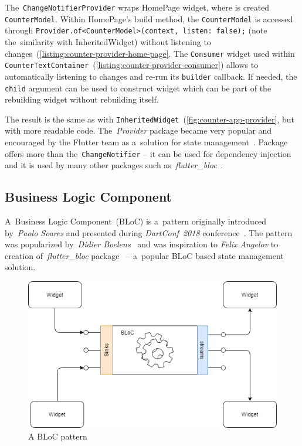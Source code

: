 The~\verb|ChangeNotifierProvider| wraps HomePage widget, where is created \verb|CounterModel|. Within HomePage's build method, the \verb|CounterModel| is accessed through \verb|Provider.of<CounterModel>(context, listen: false);| (note the~similarity with InheritedWidget) without listening to changes~(\cref{listing:counter-provider-home-page}. The \verb|Consumer| widget used within \verb|CounterTextContainer|~(\cref{listing:counter-provider-consumer}) allows to automatically listening to changes and re-run its \verb|builder| callback. If needed, the \verb|child| argument can be used to construct widget which can be part of the rebuilding widget without rebuilding itself. 

The result is the same as with \verb|InheritedWidget|~(\cref{fig:counter-app-provider}, but with more readable code. The~\textit{Provider} package became very popular and encouraged by the Flutter team as a~solution for state management~\cite{flutter-simple-state-management}. Package offers more than the~\verb|ChangeNotifier| -- it can be used for dependency injection and it is used by many other packages such as~\textit{flutter\_bloc}~\cite{package-bloc}.
\subsection{Business Logic Component}
A~Business Logic Component~(BLoC) is a~pattern originally introduced by~\textit{Paolo Soares} and presented during \textit{DartConf~2018} conference~\cite{bloc-pattern-youtube}. The pattern was popularized by~\textit{Didier Boelens}~\cite{reactive-didier} and was inspiration to \textit{Felix Angelov} to creation of~\textit{flutter\_bloc} package~\cite{package-bloc} -- a~popular BLoC based state management solution.

\begin{figure}[ht]
    \centering
    \includegraphics[width=0.6\linewidth]{img/flutter/bloc_pattern.png}
    \caption{A BLoC pattern~\cite{notion-widget-didier}}
    \label{fig:bloc-pattern}
\end{figure}

